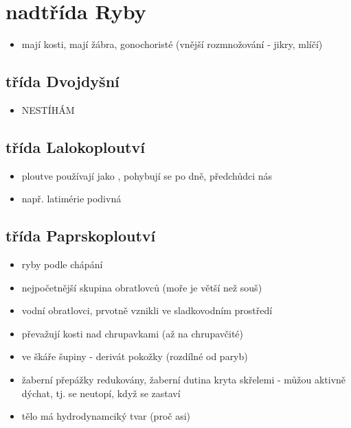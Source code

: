 \documentclass{article}
\begin{document}
\section{nadtřída Ryby}
\begin{itemize}
  \item mají kosti, mají žábra, gonochoristé (vnější rozmnožování - jikry, mlíčí)
\end{itemize}

\subsection{třída Dvojdyšní}
\begin{itemize}
  \item NESTÍHÁM
\end{itemize}

\subsection{třída Lalokoploutví}
\begin{itemize}
  \item ploutve používají jako , pohybují se po dně, předchůdci nás
  \item např. latimérie podivná
\end{itemize}

\subsection{třída Paprskoploutví}
\begin{itemize}
  \item ryby podle  chápání
  \item nejpočetnější skupina obratlovců (moře je větší než souš)
  \item vodní obratlovci, prvotně vznikli ve sladkovodním prostředí
  \item převažují kosti nad chrupavkami (až na chrupavčité)
  \item ve škáře šupiny - derivát pokožky (rozdílné od paryb)
  \item žaberní přepážky redukovány, žaberní dutina kryta skřelemi - můžou aktivně dýchat, tj. se neutopí, když se zastaví
  \item tělo má hydrodynamciký tvar (proč asi)
\end{itemize}
\end{document}

